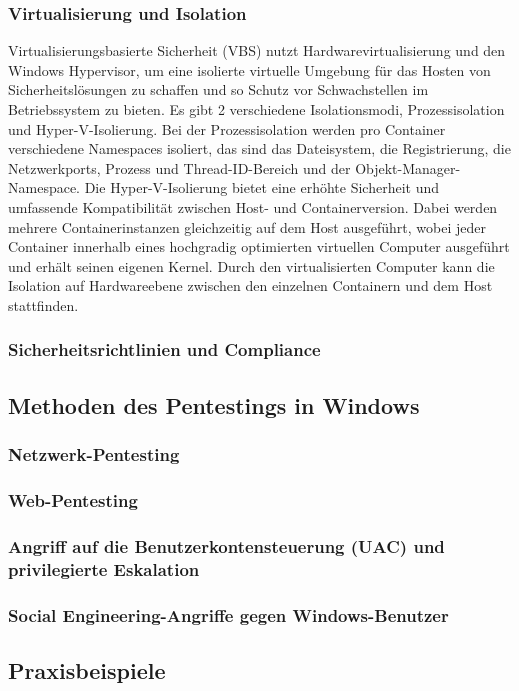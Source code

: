 \subsubsection{Virtualisierung und Isolation}

Virtualisierungsbasierte Sicherheit (VBS) nutzt Hardwarevirtualisierung und den Windows Hypervisor, um eine isolierte virtuelle Umgebung für das Hosten von Sicherheitslösungen zu schaffen und so Schutz vor Schwachstellen im Betriebssystem zu bieten. 
Es gibt 2 verschiedene Isolationsmodi, Prozessisolation und Hyper-V-Isolierung. Bei der Prozessisolation werden pro Container verschiedene Namespaces isoliert, das sind das Dateisystem, die Registrierung, die Netzwerkports, Prozess und Thread-ID-Bereich und der Objekt-Manager-Namespace.
Die Hyper-V-Isolierung bietet eine erhöhte Sicherheit und umfassende Kompatibilität zwischen Host- und Containerversion. Dabei werden mehrere Containerinstanzen gleichzeitig auf dem Host ausgeführt, wobei jeder Container innerhalb eines hochgradig optimierten virtuellen Computer ausgeführt und erhält seinen eigenen Kernel. Durch den virtualisierten Computer kann die Isolation auf Hardwareebene zwischen den einzelnen Containern und dem Host stattfinden.

\subsubsection{Sicherheitsrichtlinien und Compliance}

\subsection{Methoden des Pentestings in Windows}

\subsubsection{Netzwerk-Pentesting}

\subsubsection{Web-Pentesting}

\subsubsection{Angriff auf die Benutzerkontensteuerung (UAC) und privilegierte Eskalation}

\subsubsection{Social Engineering-Angriffe gegen Windows-Benutzer}

\subsection{Praxisbeispiele}
